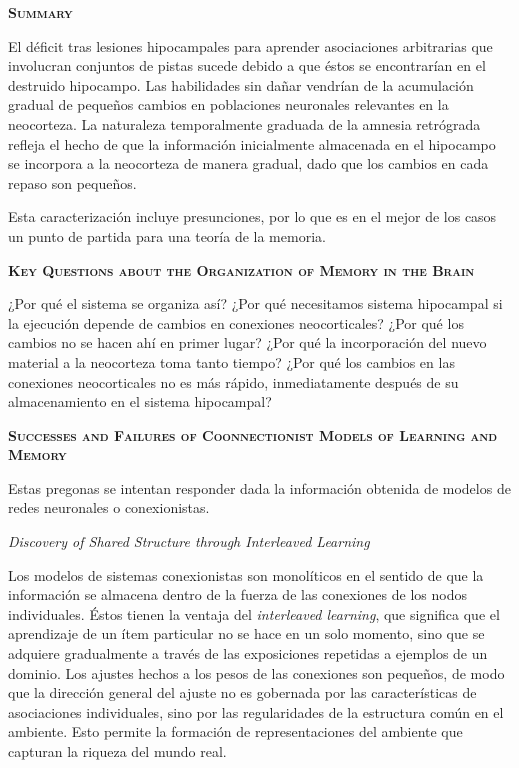 \documentclass[a4paper,12pt]{article}
\begin{document}
{\scshape\bfseries Summary}

El déficit tras lesiones hipocampales para aprender asociaciones arbitrarias que involucran conjuntos de pistas sucede debido a que éstos se encontrarían en el destruido hipocampo. Las habilidades sin dañar vendrían de la acumulación gradual de pequeños cambios en poblaciones neuronales relevantes en la neocorteza. La naturaleza temporalmente graduada de la amnesia retrógrada refleja el hecho de que la información inicialmente almacenada en el hipocampo se incorpora a la neocorteza de manera gradual, dado que los cambios en cada repaso son pequeños.

Esta caracterización incluye presunciones, por lo que es en el mejor de los casos un punto de partida para una teoría de la memoria.

{\scshape\bfseries Key Questions about the Organization of Memory in the Brain}

¿Por qué el sistema se organiza así?
¿Por qué necesitamos sistema hipocampal si la ejecución depende de cambios en conexiones neocorticales? ¿Por qué los cambios no se hacen ahí en primer lugar? ¿Por qué la incorporación del nuevo material a la neocorteza toma tanto tiempo? ¿Por qué los cambios en las conexiones neocorticales no es más rápido, inmediatamente después de su almacenamiento en el sistema hipocampal?

{\scshape\bfseries Successes and Failures of Coonnectionist Models of Learning and Memory}

Estas pregonas se intentan responder dada la información obtenida de modelos de redes neuronales o conexionistas.

{\itshape Discovery of Shared Structure through Interleaved Learning}

Los modelos de sistemas conexionistas son monolíticos en el sentido de que la información se almacena dentro de la fuerza de las conexiones de los nodos individuales. Éstos tienen la ventaja del {\itshape interleaved learning}, que significa que el aprendizaje de un ítem particular no se hace en un solo momento, sino que se adquiere gradualmente a través de las exposiciones repetidas a ejemplos de un dominio. Los ajustes hechos a los pesos de las conexiones son pequeños, de modo que la dirección general del ajuste no es gobernada por las características de asociaciones individuales, sino por las regularidades de la estructura común en el ambiente. Esto permite la formación de representaciones del ambiente que capturan la riqueza del mundo real.
\end{document}
